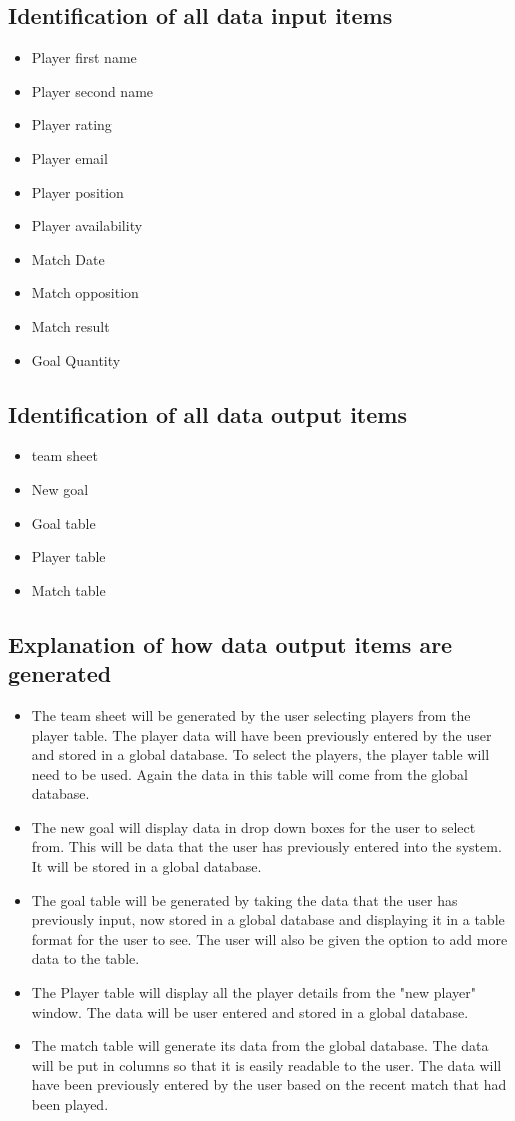 \subsection{Identification of all data input items}
\begin{itemize}
\item Player first name
\item Player second name
\item Player rating
\item Player email
\item Player position
\item Player availability
\item Match Date
\item Match opposition
\item Match result
\item Goal Quantity 

\end{itemize}

\subsection{Identification of all data output items}
\begin{itemize}
\item team sheet
\item New goal
\item Goal table
\item Player table
\item Match table
\end{itemize}
\subsection{Explanation of how data output items are generated}
\begin{itemize}
\item The team sheet will be generated by the user selecting players from the player table. The player data will have been previously entered by the user and stored in a global database. To select the players, the player table will need to be used. Again the data in this table will come from the global database.  
\item The new goal will display data in drop down boxes for the user to select from. This will be data that the user has previously entered into the system. It will be stored in a global database. 
\item The goal table will be generated by taking the data that the user has previously input, now stored in a global database and displaying it in a table format for the user to see. The user will also be given the option to add more data to the table.
\item The Player table will display all the player details from the "new player" window. The data will be user entered and stored in a global database.
\item The match table will generate its data from the global database. The data will be put in columns so that it is easily readable to the user. The data will have been previously entered by the user based on the recent match that had been played.  
\end{itemize}

